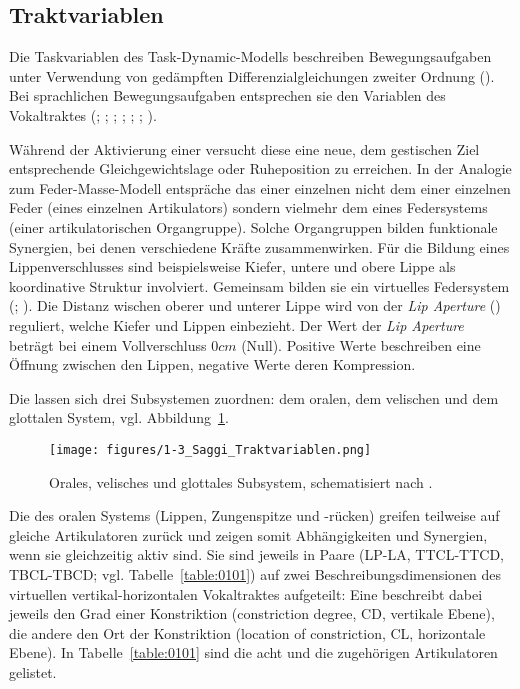 \subsection{Traktvariablen}
\label{subsec:010201}

Die Taskvariablen des Task-Dynamic-Modells beschreiben Bewegungsaufgaben unter Verwendung von gedämpften Differenzialgleichungen zweiter Ordnung (\citealt{Browman1992a}). Bei sprachlichen Bewegungsaufgaben entsprechen sie den Variablen des Vokaltraktes (; \citealt[vgl.][]{Saltzman1986}; \citealt{Saltzman1987}; \citealt{Saltzman1989}; \citealt{Browman1991a}; \citealt{Browman1992a}; \citealt{BrowmanGoldstein}).

Während der Aktivierung einer  versucht diese eine neue, dem gestischen Ziel entsprechende Gleichgewichtslage oder Ruheposition zu erreichen. In der Analogie zum Feder-Masse-Modell entspräche das  einer einzelnen  nicht dem einer einzelnen Feder (eines einzelnen Artikulators) sondern vielmehr dem eines Federsystems (einer artikulatorischen Organgruppe). Solche Organgruppen bilden funktionale Synergien, bei denen verschiedene Kräfte zusammenwirken. Für die Bildung eines Lippenverschlusses sind beispielsweise Kiefer, untere und obere Lippe als koordinative Struktur involviert. Gemeinsam bilden sie ein virtuelles Federsystem (\citealt{Saltzman1986}; \citealt{BrowmanGoldstein}). Die Distanz wischen oberer und unterer Lippe wird von der  \emph{Lip Aperture} () reguliert, welche Kiefer und Lippen einbezieht. Der Wert der  \emph{Lip Aperture} beträgt bei einem Vollverschluss $0{cm}$ (Null). Positive Werte beschreiben eine Öffnung zwischen den Lippen, negative Werte deren Kompression. 

Die  lassen sich drei Subsystemen zuordnen: dem oralen, dem velischen und dem glottalen System, vgl. Abbildung~\ref{figure:0103}.

\begin{figure}[ht]
	\texttt{[image: figures/1-3\_Saggi\_Traktvariablen.png]}
	\caption{Orales, velisches und glottales Subsystem, schematisiert nach \citealt{Hewlett2006}.}
	\label{figure:0103}
\end{figure}

\largerpage
Die  des oralen Systems (Lippen, Zungenspitze und -rücken) greifen teilweise auf gleiche Artikulatoren zurück und zeigen somit Abhängigkeiten und Synergien, wenn sie gleichzeitig aktiv sind. Sie sind jeweils in Paare (LP-LA, TTCL-TTCD, TBCL-TBCD; vgl. Tabelle~\ref{table:0101}) auf zwei Beschreibungsdimensionen des virtuellen vertikal-horizontalen Vokaltraktes aufgeteilt: Eine  beschreibt dabei jeweils den Grad einer Konstriktion (constriction degree, CD, vertikale Ebene), die andere den Ort der Konstriktion (location of constriction, CL, horizontale Ebene). In Tabelle~\ref{table:0101} sind die acht  und die zugehörigen Artikulatoren gelistet. 


